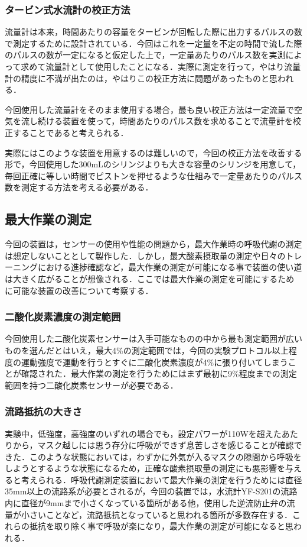 \subsubsection{タービン式水流計の校正方法}

流量計は本来，時間あたりの容量をタービンが回転した際に出力するパルスの数で測定するために設計されている．今回はこれを一定量を不定の時間で流した際のパルスの数が一定になると仮定した上で，一定量あたりのパルス数を実測によって求めて流量計として使用したことになる．実際に測定を行って，やはり流量計の精度に不満が出たのは，やはりこの校正方法に問題があったものと思われる．

今回使用した流量計をそのまま使用する場合，最も良い校正方法は一定流量で空気を流し続ける装置を使って，時間あたりのパルス数を求めることで流量計を校正することであると考えられる．

実際にはこのような装置を用意するのは難しいので，今回の校正方法を改善する形で，今回使用した300mLのシリンジよりも大きな容量のシリンジを用意して，毎回正確に等しい時間でピストンを押せるような仕組みで一定量あたりのパルス数を測定する方法を考える必要がある．

\subsection{最大作業の測定}

今回の装置は，センサーの使用や性能の問題から，最大作業時の呼吸代謝の測定は想定しないこととして製作した．しかし，最大酸素摂取量の測定や日々のトレーニングにおける進捗確認など，最大作業の測定が可能になる事で装置の使い道は大きく広がることが想像される．ここでは最大作業の測定を可能にするために可能な装置の改善について考察する．

\subsubsection{二酸化炭素濃度の測定範囲}

今回使用した二酸化炭素センサーは入手可能なものの中から最も測定範囲が広いものを選んだとはいえ，最大4\%の測定範囲では，今回の実験プロトコル以上程度の運動強度で運動を行うとすぐに二酸化炭素濃度が4\%に張り付いてしまうことが確認された．最大作業の測定を行うためにはまず最初に9\%程度までの測定範囲を持つ二酸化炭素センサーが必要である．

\subsubsection{流路抵抗の大きさ}

実験中，低強度，高強度のいずれの場合でも，設定パワーが110Wを超えたあたりから，マスク越しには思う存分に呼吸ができず息苦しさを感じることが確認できた．このような状態においては，わずかに外気が入るマスクの隙間から呼吸をしようとするような状態になるため，正確な酸素摂取量の測定にも悪影響を与えると考えられる．呼吸代謝測定装置において最大作業の測定を行うためには直径35mm以上の流路系が必要とされるが，今回の装置では，水流計YF-S201の流路内に直径が9mmまで小さくなっている箇所がある他，使用した逆流防止弁の流量が小さいことなど，流路抵抗となっていると思われる箇所が多数存在する．これらの抵抗を取り除く事で呼吸が楽になり，最大作業の測定が可能になると思われる．

